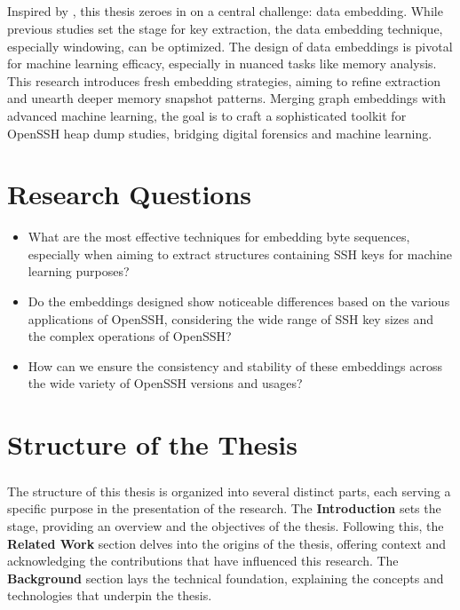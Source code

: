 \paragraph*{}Inspired by , this thesis zeroes in on a central challenge: data embedding. While previous studies set the stage for key extraction, the data embedding technique, especially windowing, can be optimized. The design of data embeddings is pivotal for machine learning efficacy, especially in nuanced tasks like memory analysis. This research introduces fresh embedding strategies, aiming to refine extraction and unearth deeper memory snapshot patterns. Merging graph embeddings with advanced machine learning, the goal is to craft a sophisticated toolkit for OpenSSH heap dump studies, bridging digital forensics and machine learning.


\chapter{Research Questions}

\begin{itemize}
    \item What are the most effective techniques for embedding byte sequences, especially when aiming to extract structures containing SSH keys for machine learning purposes?
    \item Do the embeddings designed show noticeable differences based on the various applications of OpenSSH, considering the wide range of SSH key sizes and the complex operations of OpenSSH?
    \item How can we ensure the consistency and stability of these embeddings across the wide variety of OpenSSH versions and usages?
\end{itemize}

\chapter{Structure of the Thesis}

\paragraph{}The structure of this thesis is organized into several distinct parts, each serving a specific purpose in the presentation of the research. The \textbf{Introduction} sets the stage, providing an overview and the objectives of the thesis. Following this, the \textbf{Related Work} section delves into the origins of the thesis, offering context and acknowledging the contributions that have influenced this research. The \textbf{Background} section lays the technical foundation, explaining the concepts and technologies that underpin the thesis.

